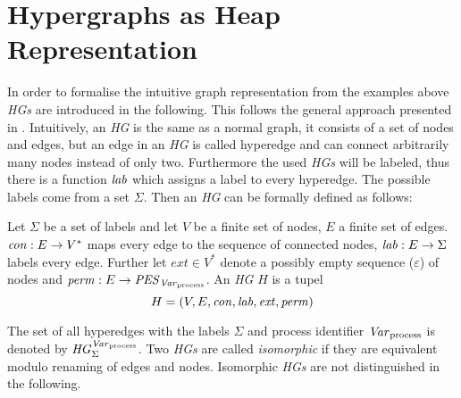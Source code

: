 \section{Hypergraphs as Heap Representation}
	In order to formalise the intuitive graph representation from the examples
	above \emph{\acp{HG}} are introduced in the following. This follows the
	general approach presented in \cites{LocalGreibachNormalForm}
	{InductivePredicates}{InformalGraphGrammars}{fmsd}. Intuitively, an
	\emph{\ac{HG}} is the same as a normal graph, it consists of a set of nodes
	and edges, but an edge in an \emph{\ac{HG}} is called hyperedge and can
	connect arbitrarily many nodes instead of only two. Furthermore the used
	\emph{\acp{HG}} will be labeled, thus there is a function $\mathit{lab}$ which
	assigns a label to every hyperedge. The possible labels come from a set
	$\Sigma$.  Then an \emph{\ac{HG}} can be formally defined as follows:
	\begin{definition}[Hypergraph]
		Let $\Sigma$ be a set of labels and let $V$ be a finite
		set of nodes, $E$ a finite set of edges.
		$\mathit{con}: E\rightarrow V^{*}$ maps every edge to the sequence of
		connected nodes, $\mathit{lab}: E\rightarrow\Sigma$ labels every edge.
		Further let $ext\in V^{*}$ denote a possibly empty
		sequence ($\varepsilon$) of nodes and $\mathit{perm}: E\rightarrow \mathit{PES}_{\mathit{Var}_{\text{process}}}$. An
		\emph{\ac{HG}} $H$ is a tupel
		\begin{equation*}
			H=(V, E, \mathit{con}, \mathit{lab}, \mathit{ext}, \mathit{perm})
		\end{equation*}
	\end{definition}
	The set of all hyperedges with the labels $\Sigma$ and process identifier 
	$\mathit{Var}_{\text{process}}$ is denoted by $\mathit{HG}_{\Sigma}^{\mathit{Var}_{\text{process}}}$. Two \emph{\acp{HG}} are called \emph{isomorphic}
	if they are equivalent modulo renaming of edges and nodes. Isomorphic
	\emph{\acp{HG}} are not distinguished in the following.

